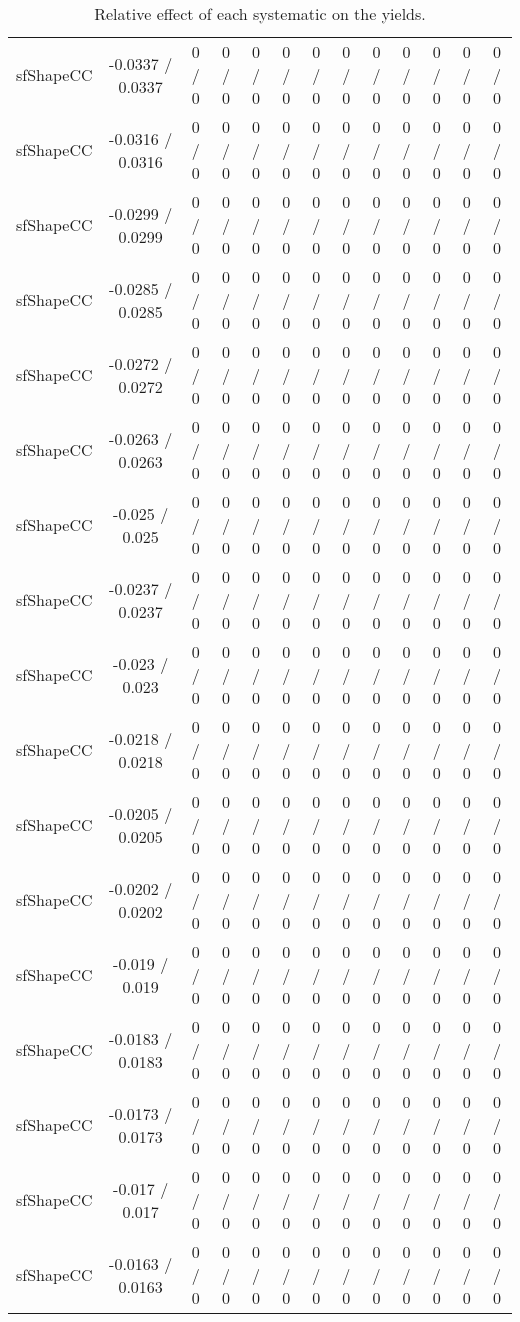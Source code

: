 \documentclass[10pt]{article}
\begin{document}
\begin{table}[htbp]
\begin{center}
\begin{tabular}{|c|c|c|c|c|c|c|c|c|c|c|c|c|}
  sfShapeCC & -0.0337 / 0.0337 & 0 / 0 & 0 / 0 & 0 / 0 & 0 / 0 & 0 / 0 & 0 / 0 & 0 / 0 & 0 / 0 & 0 / 0 & 0 / 0 & 0 / 0 \\ 
  sfShapeCC & -0.0316 / 0.0316 & 0 / 0 & 0 / 0 & 0 / 0 & 0 / 0 & 0 / 0 & 0 / 0 & 0 / 0 & 0 / 0 & 0 / 0 & 0 / 0 & 0 / 0 \\ 
  sfShapeCC & -0.0299 / 0.0299 & 0 / 0 & 0 / 0 & 0 / 0 & 0 / 0 & 0 / 0 & 0 / 0 & 0 / 0 & 0 / 0 & 0 / 0 & 0 / 0 & 0 / 0 \\ 
  sfShapeCC & -0.0285 / 0.0285 & 0 / 0 & 0 / 0 & 0 / 0 & 0 / 0 & 0 / 0 & 0 / 0 & 0 / 0 & 0 / 0 & 0 / 0 & 0 / 0 & 0 / 0 \\ 
  sfShapeCC & -0.0272 / 0.0272 & 0 / 0 & 0 / 0 & 0 / 0 & 0 / 0 & 0 / 0 & 0 / 0 & 0 / 0 & 0 / 0 & 0 / 0 & 0 / 0 & 0 / 0 \\ 
  sfShapeCC & -0.0263 / 0.0263 & 0 / 0 & 0 / 0 & 0 / 0 & 0 / 0 & 0 / 0 & 0 / 0 & 0 / 0 & 0 / 0 & 0 / 0 & 0 / 0 & 0 / 0 \\ 
  sfShapeCC & -0.025 / 0.025 & 0 / 0 & 0 / 0 & 0 / 0 & 0 / 0 & 0 / 0 & 0 / 0 & 0 / 0 & 0 / 0 & 0 / 0 & 0 / 0 & 0 / 0 \\ 
  sfShapeCC & -0.0237 / 0.0237 & 0 / 0 & 0 / 0 & 0 / 0 & 0 / 0 & 0 / 0 & 0 / 0 & 0 / 0 & 0 / 0 & 0 / 0 & 0 / 0 & 0 / 0 \\ 
  sfShapeCC & -0.023 / 0.023 & 0 / 0 & 0 / 0 & 0 / 0 & 0 / 0 & 0 / 0 & 0 / 0 & 0 / 0 & 0 / 0 & 0 / 0 & 0 / 0 & 0 / 0 \\ 
  sfShapeCC & -0.0218 / 0.0218 & 0 / 0 & 0 / 0 & 0 / 0 & 0 / 0 & 0 / 0 & 0 / 0 & 0 / 0 & 0 / 0 & 0 / 0 & 0 / 0 & 0 / 0 \\ 
  sfShapeCC & -0.0205 / 0.0205 & 0 / 0 & 0 / 0 & 0 / 0 & 0 / 0 & 0 / 0 & 0 / 0 & 0 / 0 & 0 / 0 & 0 / 0 & 0 / 0 & 0 / 0 \\ 
  sfShapeCC & -0.0202 / 0.0202 & 0 / 0 & 0 / 0 & 0 / 0 & 0 / 0 & 0 / 0 & 0 / 0 & 0 / 0 & 0 / 0 & 0 / 0 & 0 / 0 & 0 / 0 \\ 
  sfShapeCC & -0.019 / 0.019 & 0 / 0 & 0 / 0 & 0 / 0 & 0 / 0 & 0 / 0 & 0 / 0 & 0 / 0 & 0 / 0 & 0 / 0 & 0 / 0 & 0 / 0 \\ 
  sfShapeCC & -0.0183 / 0.0183 & 0 / 0 & 0 / 0 & 0 / 0 & 0 / 0 & 0 / 0 & 0 / 0 & 0 / 0 & 0 / 0 & 0 / 0 & 0 / 0 & 0 / 0 \\ 
  sfShapeCC & -0.0173 / 0.0173 & 0 / 0 & 0 / 0 & 0 / 0 & 0 / 0 & 0 / 0 & 0 / 0 & 0 / 0 & 0 / 0 & 0 / 0 & 0 / 0 & 0 / 0 \\ 
  sfShapeCC & -0.017 / 0.017 & 0 / 0 & 0 / 0 & 0 / 0 & 0 / 0 & 0 / 0 & 0 / 0 & 0 / 0 & 0 / 0 & 0 / 0 & 0 / 0 & 0 / 0 \\ 
  sfShapeCC & -0.0163 / 0.0163 & 0 / 0 & 0 / 0 & 0 / 0 & 0 / 0 & 0 / 0 & 0 / 0 & 0 / 0 & 0 / 0 & 0 / 0 & 0 / 0 & 0 / 0 \\ 
\hline 
\end{tabular} 
\caption{Relative effect of each systematic on the yields.} 
\end{center} 
\end{table} 
\end{document}
